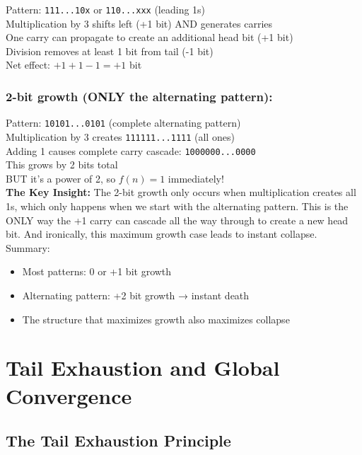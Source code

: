 \documentclass[10pt,letterpaper]{article}
\begin{document}
Pattern: \texttt{111...10x} or \texttt{110...xxx} (leading 1s) \\
Multiplication by 3 shifts left (+1 bit) AND generates carries \\
One carry can propagate to create an additional head bit (+1 bit) \\
Division removes at least 1 bit from tail (-1 bit) \\
Net effect: $+1 + 1 - 1 = +1$ bit \\

\subsubsection{2-bit growth (ONLY the alternating pattern):}

Pattern: \texttt{10101...0101} (complete alternating pattern) \\
Multiplication by 3 creates \texttt{111111...1111} (all ones) \\
Adding 1 causes complete carry cascade: \texttt{1000000...0000} \\ 
This grows by 2 bits total \\
BUT it's a power of 2, so $f(n)=1$ immediately! \\

\vspace{1em}
\textbf{The Key Insight:}
The 2-bit growth only occurs when multiplication creates all 1s, which only happens when we start with the alternating pattern. This is the ONLY way the +1 carry can cascade all the way through to create a new head bit. And ironically, this maximum growth case leads to instant collapse.
Summary:

\begin{itemize}
    \item Most patterns: 0 or +1 bit growth
    \item Alternating pattern: +2 bit growth → instant death
    \item The structure that maximizes growth also maximizes collapse
\end{itemize}




\newpage

\section{Tail Exhaustion and Global Convergence}

\subsection{The Tail Exhaustion Principle}
\end{document}
